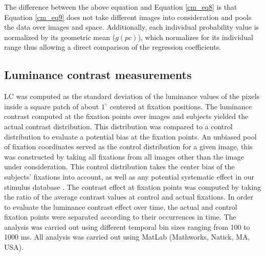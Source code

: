 The difference between the above equation and Equation \ref{cm_eq8} is that
Equation \ref{cm_eq9} does not take different images into consideration and
pools the data over images and space. Additionally, each individual
probability value is normalized by its geometric mean ($g(pc)$), which
normalizes for its individual range thus allowing a direct comparison of
the regression coefficients.


\subsection{Luminance contrast measurements}


LC was computed as the standard deviation of the luminance values of the
pixels inside a square patch of about $1^\circ$ centered at fixation
positions. The luminance contrast computed at the fixation points over
images and subjects yielded the actual contrast distribution. This
distribution was compared to a control distribution to evaluate a potential
bias at the fixation points. An unbiased pool of fixation coordinates
served as the control distribution \textemdash for a given image, this was
constructed by taking all fixations from all images other than the image
under consideration. This control distribution takes the center bias of the
subjects' fixations into account, as well as any potential systematic
effect in our stimulus database \citep{baddeley2006a, tatler2005a}. The
contrast effect at fixation points was computed by taking the ratio of the
average contrast values at control and actual fixations. In order to
evaluate the luminance contrast effect over time, the actual and control
fixation points were separated according to their occurrences in time. The
analysis was carried out using different temporal bin sizes ranging from
100 to 1000 ms. All analysis was carried out using MatLab (Mathworks,
Natick, MA, USA).

